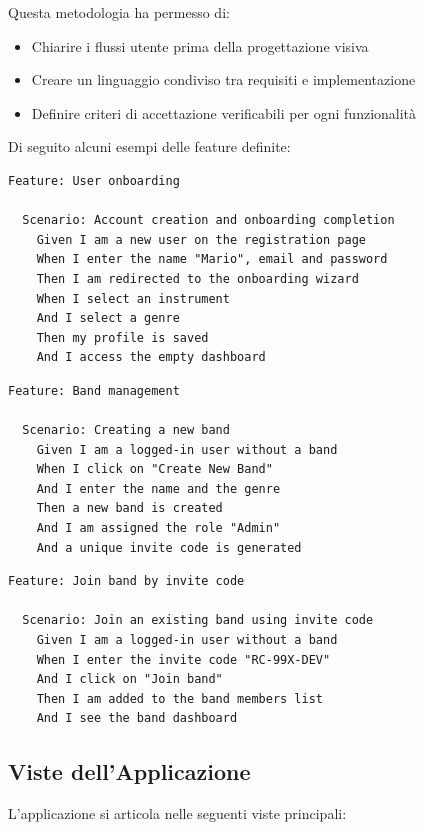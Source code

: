 \documentclass{report}
\begin{document}
Questa metodologia ha permesso di:
\begin{itemize}
    \item Chiarire i flussi utente prima della progettazione visiva
    \item Creare un linguaggio condiviso tra requisiti e implementazione
    \item Definire criteri di accettazione verificabili per ogni funzionalità
\end{itemize}

Di seguito alcuni esempi delle feature definite:

\begin{lstlisting}[caption={Feature: Registrazione e onboarding}]
Feature: User onboarding

  Scenario: Account creation and onboarding completion
    Given I am a new user on the registration page
    When I enter the name "Mario", email and password
    Then I am redirected to the onboarding wizard
    When I select an instrument
    And I select a genre
    Then my profile is saved
    And I access the empty dashboard
\end{lstlisting}

\begin{lstlisting}[caption={Feature: Creazione di una band}]
Feature: Band management

  Scenario: Creating a new band
    Given I am a logged-in user without a band
    When I click on "Create New Band"
    And I enter the name and the genre
    Then a new band is created
    And I am assigned the role "Admin"
    And a unique invite code is generated
\end{lstlisting}

\begin{lstlisting}[caption={Feature: Join band tramite codice invito}]
Feature: Join band by invite code

  Scenario: Join an existing band using invite code
    Given I am a logged-in user without a band
    When I enter the invite code "RC-99X-DEV"
    And I click on "Join band"
    Then I am added to the band members list
    And I see the band dashboard
\end{lstlisting}

\subsection{Viste dell'Applicazione}

L'applicazione si articola nelle seguenti viste principali:
\end{document}
